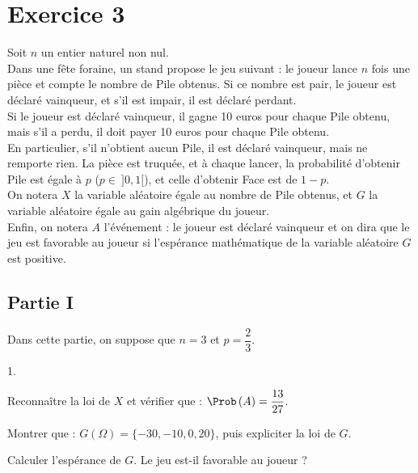 \section*{Exercice 3}

\noindent
Soit $n$ un entier naturel non nul.\\
Dans une fête foraine, un stand propose le jeu suivant : le joueur
lance $n$ fois une pièce et compte le nombre de Pile obtenus. Si ce
nombre est pair, le joueur est déclaré vainqueur, et s'il est impair,
il est déclaré perdant.\\
Si le joueur est déclaré vainqueur, il gagne 10 euros pour chaque Pile
obtenu, mais s'il a perdu, il doit payer 10 euros pour chaque Pile
obtenu.\\
En particulier, s'il n'obtient aucun Pile, il est déclaré vainqueur,
mais ne remporte rien. La pièce est truquée, et à chaque lancer, la
probabilité d'obtenir Pile est égale à $p$ ($p \in \ ]0,1[$), et celle
d'obtenir Face est de $1-p$.\\
On notera $X$ la variable aléatoire égale au nombre de Pile obtenus,
et $G$ la variable aléatoire égale au gain algébrique du joueur.\\
Enfin, on notera $A$ l'événement : \og le joueur est déclaré
vainqueur \fg{} et on dira que le jeu est favorable au joueur si
l'espérance mathématique de la variable aléatoire $G$ est positive.





\subsection*{Partie I}
 
\noindent
Dans cette partie, on suppose que $n = 3$ et $p = \dfrac{2}{3}$.
\begin{noliste}{1.}
  \setlength{\itemsep}{4mm}
\item Reconnaître la loi de $X$ et vérifier que : $\Prob\left(A\right)
  = \dfrac{13}{27}$.

  

\item Montrer que : $G(\Omega) = \{-30, -10, 0, 20\}$, puis expliciter
  la loi de $G$.

  

\item Calculer l'espérance de $G$. Le jeu est-il favorable au joueur ?
  
  
\end{noliste}


